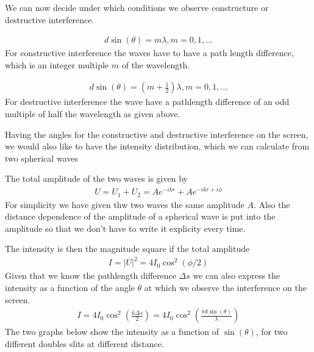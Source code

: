 \documentclass[letterpaper,10pt,english]{sphinxmanual}
\begin{document}
We can now decide under which conditions we observe constructure or destructive interference.

\begin{equation*}
\begin{split}d\sin(\theta)=m\lambda, m=0,1,\ldots\end{split}
\end{equation*}
For constructive interference the waves have to have a path length difference, which is an integer multiple \(m\) of the wavelength.

\begin{equation*}
\begin{split}d\sin(\theta)=\left (m+\frac{1}{2}\right )\lambda, m=0,1,\ldots\end{split}
\end{equation*}
For destructive interference the wave have a pathlength difference of an odd multiple of half the wavelength as given above.

Having the angles for the constructive and destructive interference on the screen, we would also like to have the intensity distribution, which we can calculate from two spherical waves

The total amplitude of the two waves is given by
\begin{equation*}
\begin{split}U=U_1+ U_2 = A e^{-ikr}+A e^{-ikr+i\phi}\end{split}
\end{equation*}
For simplicity we have given thw two waves the same amplitude \(A\). Also the distance dependence of the amplitude of a spherical wave is put into the amplitude so that we don’t have to write it explicity every time.

The intensity is then the magnitude square if the total amplitude
\begin{equation*}
\begin{split}I=|U|^2=4I_{0}\cos^2(\phi/2)\end{split}
\end{equation*}
Given that we know the pathlength difference \(\Delta s\) we can also express the intensity as a function of the angle \(\theta\) at which we observe the interference on the screen.
\begin{equation*}
\begin{split}I=4I_0 \cos^2\left ( \frac{k \Delta s}{2}\right)=4I_0 \cos^2\left ( \frac{\pi d \sin(\theta)}{\lambda}\right)\end{split}
\end{equation*}
The two graphs below show the intensity as a function of \(\sin(\theta)\), for two different doubles slits at different distance.
\end{document}
